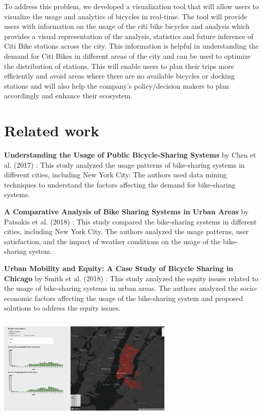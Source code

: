 \documentclass[journal]{vgtc}                     %
\begin{document}
To address this problem, we developed a visualization tool that will allow users to visualize the usage and analytics of bicycles in real-time. The tool will provide users with information on the usage of the citi bike bicycles and analysis which provides a visual representation of the analysis, statistics and future inference of Citi Bike stations across the city. This information is helpful in understanding the demand for Citi Bikes in different areas of the city and can be used to optimize the distribution of stations. This will enable users to plan their trips more efficiently and avoid areas where there are no available bicycles or docking stations and will also help the company's policy/decision makers to plan accordingly and enhance their ecosystem.


\section{Related work}
\textbf{Understanding the Usage of Public Bicycle-Sharing Systems} by Chen et al. (2017) \cite{Xiaonan Zhang}: This study analyzed the usage patterns of bike-sharing systems in different cities, including New York City. The authors used data mining techniques to understand the factors affecting the demand for bike-sharing systems.

\textbf{A Comparative Analysis of Bike Sharing Systems in Urban Areas} by Patsakis et al. (2018) \cite{Yuan}: This study compared the bike-sharing systems in different cities, including New York City. The authors analyzed the usage patterns, user satisfaction, and the impact of weather conditions on the usage of the bike-sharing system.

\textbf{Urban Mobility and Equity: A Case Study of Bicycle Sharing in Chicago} by Smith et al. (2018) \cite{August 2020}: This study analyzed the equity issues related to the usage of bike-sharing systems in urban areas. The authors analyzed the socio-economic factors affecting the usage of the bike-sharing system and proposed solutions to address the equity issues.\hfill \break

\parbox{\linewidth}{
        \includegraphics[width=3.3in, height=2in]{figs/analysis.png}\\
        }
        
\end{document}
